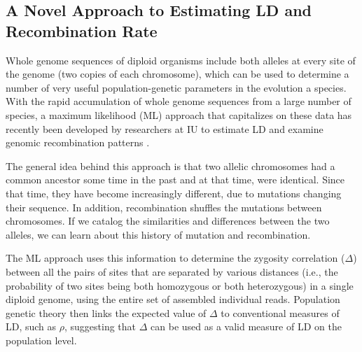 \documentclass{sig-alternate}
\begin{document}
\subsection{ A Novel Approach to Estimating LD and Recombination Rate}\label{sec:migration}
Whole genome sequences of diploid organisms include both alleles at every site of the genome (two copies of
each chromosome), which can be used to determine a number of very useful population-genetic parameters in the
evolution a species. With the rapid accumulation of whole genome sequences from a large number of species, a
maximum likelihood (ML) approach that capitalizes on these data has recently been developed by researchers at
IU to estimate LD and examine genomic recombination patterns \cite{Lynch01112008,MEC:MEC4482}.

The general idea behind this approach is that two allelic chromosomes had a common ancestor some time in the
past and at that time, were
identical. Since that time, they have become 
increasingly different, due to mutations changing their sequence. In 
addition, recombination shuffles the mutations between chromosomes. If we catalog the similarities and
differences between the two alleles, we can learn about this history of mutation and recombination.

The ML approach uses this information to determine the zygosity correlation ($\Delta$) between all the pairs
of sites that are separated by various distances (i.e., the probability of two sites being both homozygous or
both heterozygous) in a single diploid genome, using the entire set of assembled individual reads. Population genetic
theory then links the expected value of $\Delta$ to conventional measures of LD, such as $\rho$, suggesting
that $\Delta$ can be used as a valid measure of LD on the population level.



\end{document}
